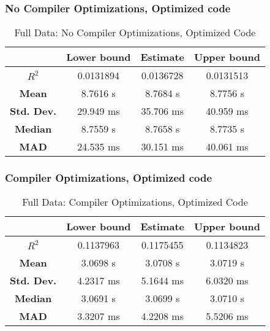 \subsubsection{No Compiler Optimizations, Optimized code}
\begin{table}[H]
\centering
\begin{tabular}{|c|c|c|c|}
\hline
\textbf{} & \textbf{Lower bound} & \textbf{Estimate} & \textbf{Upper bound} \\
\hline
\textbf{$R^2$} & 0.0131894 & 0.0136728 & 0.0131513 \\
\hline
\textbf{Mean} & 8.7616 s & 8.7684 s & 8.7756 s \\
\hline
\textbf{Std. Dev.} & 29.949 ms & 35.706 ms & 40.959 ms \\
\hline
\textbf{Median} & 8.7559 s & 8.7658 s & 8.7735 s \\
\hline
\textbf{MAD} & 24.535 ms & 30.151 ms & 40.061 ms \\
\hline
\end{tabular}
\caption{Full Data: No Compiler Optimizations, Optimized Code}
\end{table}


\subsubsection{Compiler Optimizations, Optimized code}
\begin{table}[H]
\centering
\begin{tabular}{|c|c|c|c|}
\hline
\textbf{} & \textbf{Lower bound} & \textbf{Estimate} & \textbf{Upper bound} \\
\hline
\textbf{$R^2$} & 0.1137963 & 0.1175455 & 0.1134823 \\
\hline
\textbf{Mean} & 3.0698 s & 3.0708 s & 3.0719 s \\
\hline
\textbf{Std. Dev.} & 4.2317 ms & 5.1644 ms & 6.0320 ms \\
\hline
\textbf{Median} & 3.0691 s & 3.0699 s & 3.0710 s \\
\hline
\textbf{MAD} & 3.3207 ms & 4.2208 ms & 5.5206 ms \\
\hline
\end{tabular}
\caption{Full Data: Compiler Optimizations, Optimized Code}
\end{table}


